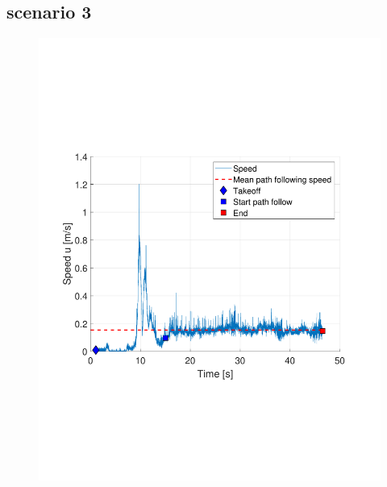 \documentclass[numbered,pdftex]{ohio-etd}
\begin{document}
\subsection{scenario 3}
\begin{figure}[H]
	\centering
	\includegraphics[trim = 0 150 0 200, clip, width=12cm]{Figures/results/compareFigures/2u}
	\caption{}
	\label{fig:3u}
\end{figure}
\end{document}
